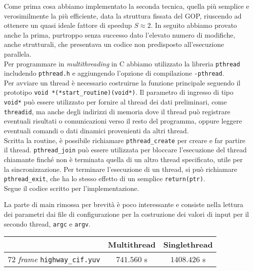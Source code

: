 Come prima cosa abbiamo implementato la seconda tecnica, quella più 
semplice e verosimilmente la più efficiente, data la struttura fissata del GOP, 
riuscendo ad ottenere un quasi ideale fattore di speedup $S \approx 2$. In 
seguito abbiamo provato anche la prima, purtroppo senza successo dato l'elevato 
numero di modifiche, anche strutturali, che presentava un codice non 
predisposto all'esecuzione parallela.
\\Per programmare in \emph{multithreading} in C abbiamo utilizzato la libreria 
\verb|pthread| includendo \verb|pthread.h| e aggiungendo l'opzione di 
compilazione \verb|-pthread|.\\
Per avviare un thread è necessario costruirne la funzione principale seguendo 
il prototipo \verb|void *(*start_routine)(void*)|. Il parametro di ingresso di 
tipo \verb|void*| può essere utilizzato per fornire al thread dei dati 
preliminari, come \verb|threadid|, ma anche degli indirizzi di 
memoria dove il thread può registrare eventuali risultati o comunicazioni verso 
il resto del programma, oppure leggere eventuali comandi o dati dinamici 
provenienti da altri thread. \\
Scritta la routine, è possibile richiamare \verb|pthread_create| per creare e 
far partire il thread. \verb|pthread_join| può essere utilizzata per bloccare 
l'esecuzione del thread chiamante finché non è terminata quella di un altro 
thread specificato, utile per la sincronizzazione. Per terminare l'esecuzione 
di un thread, si può richiamare \verb|pthread_exit|, che ha lo stesso effetto 
di un semplice \verb|return(ptr)|.\\
Segue il codice scritto per l'implementazione.\\
\begin{center}

\end{center}
La parte di main rimossa per brevità è poco interessante e consiste nella 
lettura dei parametri dai file di configurazione per la costruzione dei valori 
di input per il secondo thread, \verb|argc| e \verb|argv|.

\begin{center}
	\begin{tabular}{|r|c|c|}
    \hline
    
		& \textbf{Multithread} & \textbf{Singlethread} \\
    
    \hline
		\hline
    \hline
    
		$72$ \textit{frame} \verb|highway_cif.yuv| & $741.560$ s & $1408.426$ s \\
    
    \hline
	\end{tabular}
\end{center}

